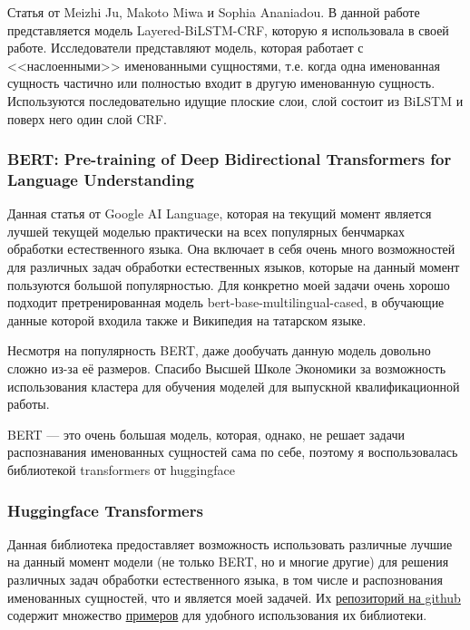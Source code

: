 Статья от Meizhi Ju, Makoto Miwa и Sophia Ananiadou. В данной работе представляется модель Layered-BiLSTM-CRF, которую я использовала в своей работе. Исследователи представляют модель, которая работает с <<наслоенными>> именованными сущностями, т.е. когда одна именованная сущность частично или полностью входит в другую именованную сущность. Используются последовательно идущие плоские слои, слой состоит из BiLSTM и поверх него один слой CRF. 

\subsubsection{BERT: Pre-training of Deep Bidirectional Transformers for
Language Understanding} \cite{DBLP:journals/corr/abs-1810-04805}

Данная статья от Google AI Language, которая на текущий момент является лучшей текущей моделью практически на всех популярных бенчмарках обработки естественного языка. Она включает в себя очень много возможностей для различных задач обработки естественных языков, которые на данный момент пользуются большой популярностью. Для конкретно моей задачи очень хорошо подходит претренированная модель bert-base-multilingual-cased, в обучающие данные которой входила также и Википедия на татарском языке.

Несмотря на популярность BERT, даже дообучать данную модель довольно сложно из-за её размеров. Спасибо Высшей Школе Экономики за возможность использования кластера для обучения моделей для выпускной квалификационной работы.

BERT --- это очень большая модель, которая, однако, не решает задачи распознавания именованных сущностей сама по себе, поэтому я воспользовалась библиотекой transformers от huggingface \cite{Wolf2019HuggingFacesTS}

\subsubsection{Huggingface Transformers}

Данная библиотека предоставляет возможность использовать различные лучшие на данный момент модели (не только BERT, но и многие другие) для решения различных задач обработки естественного языка, в том числе и распознования именованных сущностей, что и является моей задачей.
Их \href{https://github.com/huggingface/transformers}{репозиторий на github} содержит множество \href{https://github.com/huggingface/transformers/tree/master/examples/}{примеров} для удобного использования их библиотеки.


